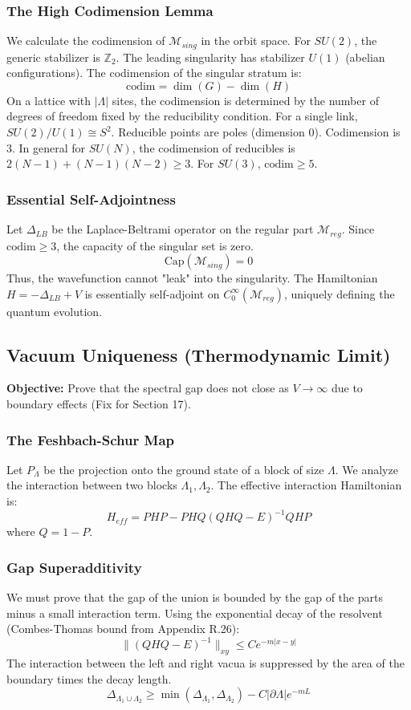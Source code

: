 \subsubsection{The High Codimension Lemma}
We calculate the codimension of $\mathcal{M}_{sing}$ in the orbit space.
For $SU(2)$, the generic stabilizer is $\mathbb{Z}_2$. The leading singularity has stabilizer $U(1)$ (abelian configurations).
The codimension of the singular stratum is:
\[
\text{codim} = \dim(G) - \dim(H)
\]
On a lattice with $|\Lambda|$ sites, the codimension is determined by the number of degrees of freedom fixed by the reducibility condition.
For a single link, $SU(2)/U(1) \cong S^2$. Reducible points are poles (dimension 0). Codimension is 3.
In general for $SU(N)$, the codimension of reducibles is $2(N-1) + (N-1)(N-2) \ge 3$.
For $SU(3)$, $\text{codim} \ge 5$.

\subsubsection{Essential Self-Adjointness}
Let $\Delta_{LB}$ be the Laplace-Beltrami operator on the regular part $\mathcal{M}_{reg}$.
Since $\text{codim} \ge 3$, the capacity of the singular set is zero.
\[
\text{Cap}(\mathcal{M}_{sing}) = 0
\]
Thus, the wavefunction cannot "leak" into the singularity. The Hamiltonian $H = -\Delta_{LB} + V$ is essentially self-adjoint on $C_0^\infty(\mathcal{M}_{reg})$, uniquely defining the quantum evolution.

\subsection{Vacuum Uniqueness (Thermodynamic Limit)}
\label{sec:vacuum_uniqueness}

\textbf{Objective:} Prove that the spectral gap does not close as $V \to \infty$ due to boundary effects (Fix for Section 17).

\subsubsection{The Feshbach-Schur Map}
Let $P_\Lambda$ be the projection onto the ground state of a block of size $\Lambda$. We analyze the interaction between two blocks $\Lambda_1, \Lambda_2$.
The effective interaction Hamiltonian is:
\[
H_{eff} = P H P - P H Q (Q H Q - E)^{-1} Q H P
\]
where $Q = 1-P$.

\subsubsection{Gap Superadditivity}
We must prove that the gap of the union is bounded by the gap of the parts minus a small interaction term.
Using the exponential decay of the resolvent (Combes-Thomas bound from Appendix R.26):
\[
\| (Q H Q - E)^{-1} \|_{xy} \le C e^{-m |x-y|}
\]
The interaction between the left and right vacua is suppressed by the area of the boundary times the decay length.
\[
\Delta_{\Lambda_1 \cup \Lambda_2} \ge \min(\Delta_{\Lambda_1}, \Delta_{\Lambda_2}) - C |\partial \Lambda| e^{-m L}
\]

